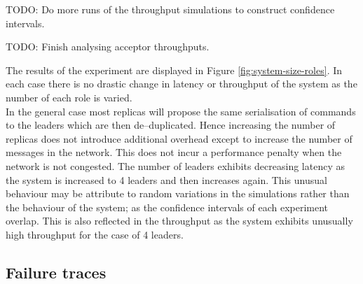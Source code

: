 
{\color{red}TODO: Do more runs of the throughput simulations to construct confidence intervals. \\}

{\color{red}TODO: Finish analysing acceptor throughputs. \\}

The results of the experiment are displayed in Figure \ref{fig:system-size-roles}. In each case there is no drastic change in latency or throughput of the system as the number of each role is varied. \\

In the general case most replicas will propose the same serialisation of commands to the leaders which are then de--duplicated. Hence increasing the number of replicas does not introduce additional overhead except to increase the number of messages in the network. This does not incur a performance penalty when the network is not congested. The number of leaders exhibits decreasing latency as the system is increased to 4 leaders and then increases again. This unusual behaviour may be attribute to random variations in the simulations rather than the behaviour of the system; as the confidence intervals of each experiment overlap. This is also reflected in the throughput as the system exhibits unusually high throughput for the case of 4 leaders. \\

\subsection{Failure traces}

